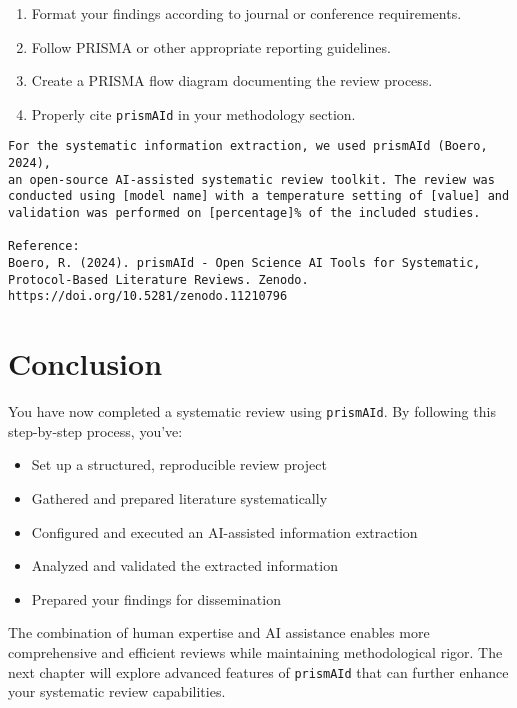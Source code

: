 \begin{enumerate}
    \item Format your findings according to journal or conference requirements.
    \item Follow PRISMA or other appropriate reporting guidelines.
    \item Create a PRISMA flow diagram documenting the review process.
    \item Properly cite \texttt{prismAId} in your methodology section.
\end{enumerate}

\begin{infobox}
\begin{lstlisting}
For the systematic information extraction, we used prismAId (Boero, 2024),
an open-source AI-assisted systematic review toolkit. The review was
conducted using [model name] with a temperature setting of [value] and
validation was performed on [percentage]% of the included studies.

Reference:
Boero, R. (2024). prismAId - Open Science AI Tools for Systematic,
Protocol-Based Literature Reviews. Zenodo.
https://doi.org/10.5281/zenodo.11210796
\end{lstlisting}
\end{infobox}

\section{Conclusion}

You have now completed a systematic review using \texttt{prismAId}. By following this step-by-step process, you've:

\begin{itemize}
    \item Set up a structured, reproducible review project
    \item Gathered and prepared literature systematically
    \item Configured and executed an AI-assisted information extraction
    \item Analyzed and validated the extracted information
    \item Prepared your findings for dissemination
\end{itemize}


The combination of human expertise and AI assistance enables more comprehensive and efficient reviews while maintaining methodological rigor. The next chapter will explore advanced features of \texttt{prismAId} that can further enhance your systematic review capabilities.
